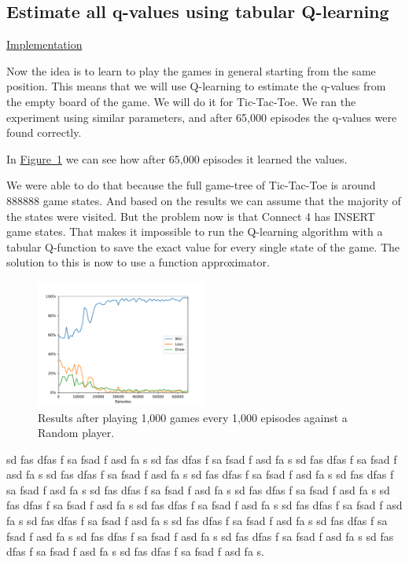 \documentclass{article}
\newcommand{\GithubURL}[2]{
\noindent
\href{https://github.com/davidrobles/mlnd-capstone-code/blob/master/#1}{#2}
\break
}
\begin{document}
\subsection{Estimate all q-values using tabular Q-learning}

\GithubURL{examples/tic_ql_tab_full.py}{Implementation}

Now the idea is to learn to play the games in general starting from the same position. This means
that we will use Q-learning to estimate the q-values from the empty board of the game. We will do it
for Tic-Tac-Toe. We ran the experiment using similar parameters, and after 65,000 episodes the
q-values were found correctly.


In \hyperref[fig:tic-ql-tab-full-wld-plot]{Figure~\ref*{fig:tic-ql-tab-full-wld-plot}} we can see
how after 65,000 episodes it learned the values.

We were able to do that because the full game-tree of Tic-Tac-Toe is around 888888 game states. And
based on the results we can assume that the majority of the states were visited. But the problem now
is that Connect 4 has INSERT game states. That makes it impossible to run the Q-learning algorithm
with a tabular Q-function to save the exact value for every single state of the game. The solution
to this is now to use a function approximator.

\begin{figure}[!h]
    \centering
    \includegraphics[width=0.50\textwidth]{figures/tic_ql_tab_full_wld_plot.pdf}
    \caption{Results after playing 1,000 games every 1,000 episodes against a Random player.}
    \label{fig:tic-ql-tab-full-wld-plot}
\end{figure}

sd fas dfas f sa fsad f asd fa s sd fas dfas f sa fsad f asd fa s sd fas dfas f sa fsad f asd fa s
sd fas dfas f sa fsad f asd fa s sd fas dfas f sa fsad f asd fa s sd fas dfas f sa fsad f asd fa s
sd fas dfas f sa fsad f asd fa s sd fas dfas f sa fsad f asd fa s sd fas dfas f sa fsad f asd fa s
sd fas dfas f sa fsad f asd fa s sd fas dfas f sa fsad f asd fa s sd fas dfas f sa fsad f asd fa s
sd fas dfas f sa fsad f asd fa s sd fas dfas f sa fsad f asd fa s sd fas dfas f sa fsad f asd fa s
sd fas dfas f sa fsad f asd fa s sd fas dfas f sa fsad f asd fa s sd fas dfas f sa fsad f asd fa s.
\end{document}
